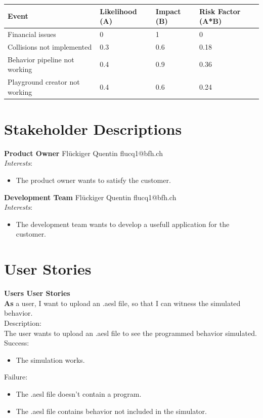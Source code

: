 \documentclass{scrbook}
\begin{document}
\begin{tabular}{p{2cm} p{2cm} p{2cm} p{2cm}}
  Event & Likelihood (A) & Impact (B) & Risk Factor (A*B) \\ \hline
  Financial issues & 0 & 1 & 0 \\
  Collisions not implemented & 0.3 & 0.6 & 0.18 \\
  Behavior pipeline not working & 0.4 & 0.9 & 0.36 \\
  Playground creator not working & 0.4 & 0.6 & 0.24 \\
\end{tabular}

\section{Stakeholder Descriptions}
\textbf{Product Owner}
Flückiger Quentin flucq1@bfh.ch \\
\textit{Interests}:
\begin{itemize}
  \item The product owner wants to satisfy the customer.
\end{itemize}


\textbf{Development Team}
Flückiger Quentin flucq1@bfh.ch \\
\textit{Interests}:
\begin{itemize}
  \item The development team wants to develop a usefull application for the customer.
\end{itemize}

\section{User Stories}
\textbf{\large Users User Stories}\\
\textbf{As} a user, I want to upload an .aesl file, so that I can witness the simulated behavior. \\
Description:\\
The user wants to upload an .aesl file to see the programmed behavior simulated.
Success:\\
\begin{itemize}
  \item The simulation works.
\end{itemize}
Failure:\\
\begin{itemize}
  \item The .aesl file doesn't contain a program.
  \item The .aesl file contains behavior not included in the simulator.
\end{itemize}
\end{document}
